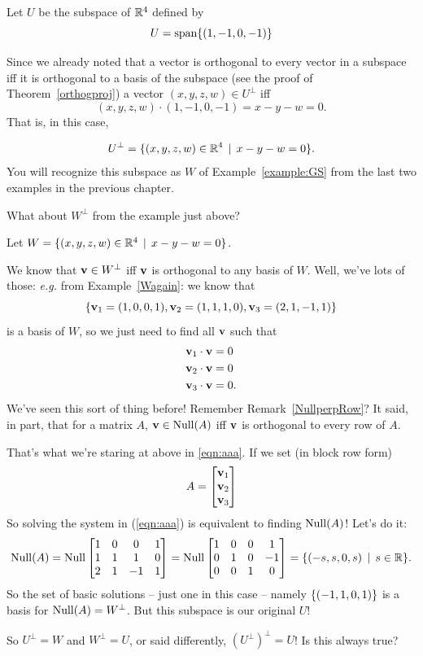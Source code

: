\begin{myexample}
Let $U$ be the subspace of $\mathbb{R}^4$ defined by  $$U=\textrm{span}\{(1,-1,0,-1)\} $$ 




Since we already noted that a vector is orthogonal to every vector in a subspace iff it is orthogonal to a basis of the subspace (see the proof of Theorem~\ref{orthogproj}) a vector $(x,y,z,w) \in U^\perp$ iff 
$$(x,y,z,w)\cdot (1,-1,0,-1)= x - y - w=0.$$ That is, in this case, 

$$U^\perp=\{(x,y,z,w)\in \mathbb{R}^4\,\mid \, x - y - w = 0 \}.
$$
You will recognize this subspace as $W$ of Example~\ref{example:GS} from the last two examples in the previous chapter. 
\end{myexample}

What about $W^\perp$ from the example just above?\medskip

\begin{myexample}
Let $W=\{(x,y,z,w)\in \mathbb{R}^4\,\mid \, x - y - w = 0 \}$.

 \medskip

We know that $\mathbf{v} \in W^\perp$ iff $\mathbf{v}$ is orthogonal to any basis of $W$. Well, we've lots of those: \emph{e.g.} from Example~\ref{Wagain}: we know that $$ \{\mathbf{v}_1=(1,0,0,1), \mathbf{v}_2=(1,1,1,0), \mathbf{v}_3=(2,1,-1,1) \}$$ is a basis of $W$, so we just need to find  all $\mathbf{v}$ such that 
\begin{align}\label{eqn:aaa}
\notag \mathbf{v}_1\cdot \mathbf{v}&=0\\
\mathbf{v}_2\cdot \mathbf{v}&=0\\
\notag \mathbf{v}_3\cdot \mathbf{v}&=0.
  \end{align}
We've seen this sort of thing before! Remember Remark~\ref{NullperpRow}? It said, in part, that for a matrix $A$, $\mathbf{v}\in \operatorname{Null}(A)$ iff $ \mathbf{v}$ is orthogonal to every row of $A$.

That's what we're staring at above in \eqref{eqn:aaa}. If we set (in block row form)  
$$  A=  \bmatrix \vv_1\\\vv_2 \\\vv_3\endbmatrix$$
So solving the system in (\ref{eqn:aaa}) is equivalent to finding $\operatorname{Null}(A)$! Let's do it:
$$\Null(A)=\Null \bmatrix  1&0&0&1\\1&1&1&0\\2&1&-1&1\endbmatrix =\Null\bmatrix  1 & 0 & 0 & 1 \\
 0 & 1 & 0 & -1 \\
 0 & 0 & 1 & 0 \\\endbmatrix=\set{(-s,s,0,s)\st s\in \R}.$$
So the set of basic solutions -- just one in this case -- namely $\{(-1,1,0,1) \}$ is a basis for $\operatorname{Null}(A)= W^\perp$. But this subspace is our original $U$! 

So $U^\perp=W$ and $W^\perp=U$, or said differently, $(U^\perp)^\perp=U$!  Is this always true?
\end{myexample}

